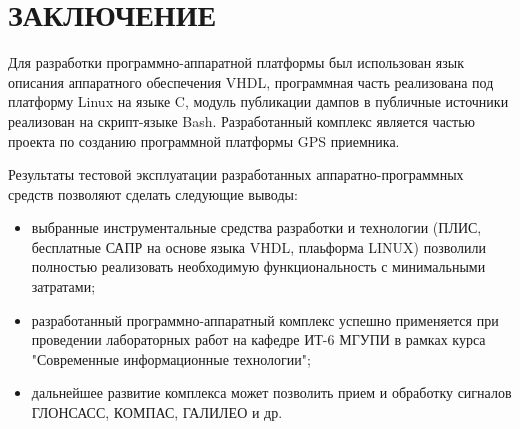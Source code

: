 \section*{ЗАКЛЮЧЕНИЕ}
Для разработки программно-аппаратной платформы был использован язык описания аппаратного обеспечения VHDL, программная часть реализована
под платформу Linux на языке C, модуль публикации дампов в публичные источники реализован на скрипт-языке Bash. Разработанный комплекс
является частью проекта по созданию программной платформы GPS приемника. 

Результаты тестовой эксплуатации разработанных аппаратно-программных средств позволяют сделать следующие выводы:
\begin{itemize}
\item выбранные инструментальные средства разработки и технологии  (ПЛИС, бесплатные САПР на основе языка VHDL, плаьформа LINUX) позволили
	полностью реализовать необходимую функциональность с минимальными затратами;
\item разработанный программно-аппаратный комплекс успешно применяется при проведении лабораторных работ на кафедре ИТ-6 МГУПИ в
	рамках курса "Современные информационные технологии";
\item дальнейшее развитие комплекса может позволить прием и обработку сигналов ГЛОНСАСС, КОМПАС, ГАЛИЛЕО и др.
\end{itemize}


\newpage
